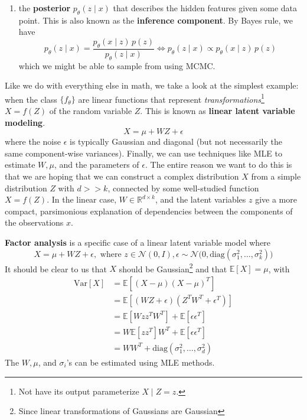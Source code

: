 \begin{definition}
\begin{enumerate}
      \item the \textbf{posterior} $p_\theta (z \mid x)$ that describes the hidden features given some data point. This is also known as the \textbf{inference component}. By Bayes rule, we have 
      \begin{equation}
        p_\theta (z \mid x) = \frac{p_\theta (x \mid z) \, p(z)}{p_\theta (z \mid x)} \iff p_\theta (z \mid x) \propto p_\theta (x \mid z) \, p(z)
      \end{equation}
      which we might be able to sample from using MCMC. 
    \end{enumerate}
  \end{definition} 

  Like we do with everything else in math, we take a look at the simplest example: when the class $\{f_\theta\}$ are linear functions that represent \textit{transformations}\footnote{Not have its output parameterize $X \mid Z = z$.} $X = f(Z)$ of the random variable $Z$. This is known as \textbf{linear latent variable modeling}. 
  \begin{equation}
    X = \mu + W Z + \epsilon
  \end{equation}
  where the noise $\epsilon$ is typically Gaussian and diagonal (but not necessarily the same component-wise variances). Finally, we can use techniques like MLE to estimate $W, \mu$, and the parameters of $\epsilon$. The entire reason we want to do this is that we are hoping that we can construct a complex distribution $X$ from a simple distribution $Z$ with $d >> k$, connected by some well-studied function $X = f(Z)$. In the linear case, $W \in \mathbb{R}^{d \times k}$, and the latent variables $z$ give a more compact, parsimonious  explanation of dependencies between the components of the observations $x$. 

  \begin{definition} 
    \textbf{Factor analysis} is a specific case of a linear latent variable model where 
    \begin{equation}
      X = \mu + WZ + \epsilon, \text{ where } z \in \mathcal{N}(0, I), \epsilon \sim \mathcal{N} \big(0, \mathrm{diag}(\sigma_1^2, \ldots, \sigma_k^2) \big)
    \end{equation}
    It should be clear to us that $X$ should be Gaussian\footnote{Since linear transformations of Gaussians are Gaussian} and that $\mathbb{E}[X] = \mu$, with 
    \begin{align} 
        \mathrm{Var}[X] & = \mathbb{E}[ (X - \mu)(X - \mu)^T ] \\
                        & = \mathbb{E}[ (W Z + \epsilon) (Z^T W^T + \epsilon^T)] \\
                        & = \mathbb{E}[W z z^T W^T] + \mathbb{E}[ \epsilon \epsilon^T] \\
                        & = W \mathbb{E}[ z z^T] W^T + \mathbb{E}[ \epsilon \epsilon^T] \\
                        & = W W^T + \mathrm{diag}(\sigma_1^2, \ldots, \sigma_d^2) 
    \end{align} 
    The $W, \mu$, and $\sigma_i$'s can be estimated using MLE methods. 
  \end{definition} 

